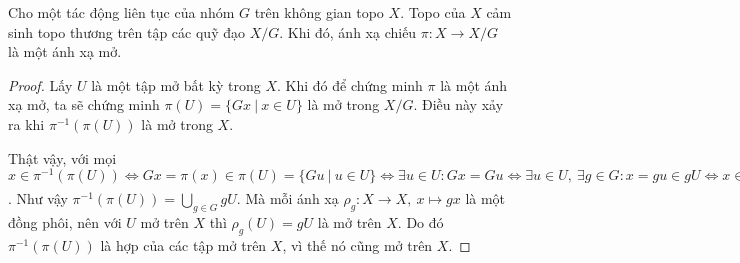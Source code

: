\begin{prop}\label{prop 1.1.6}
    Cho một tác động liên tục của nhóm $G$ trên không gian topo $X$. Topo của $X$ cảm sinh topo thương trên tập các quỹ đạo $X/G$. Khi đó, ánh xạ chiếu $\pi: X\to X/G$ là một ánh xạ mở. 
\end{prop}
\begin{proof}
    Lấy $U$ là một tập mở bất kỳ trong $X$. Khi đó để chứng minh $\pi$ là một ánh xạ mở, ta sẽ chứng minh $\pi(U) = \{Gx~|~x\in U\}$ là mở trong $X/G$. Điều này xảy ra khi $\pi^{-1}(\pi(U))$ là mở trong $X$.

    Thật vậy, với mọi $x \in \pi^{-1}(\pi(U))\Leftrightarrow Gx = \pi(x) \in \pi(U) = \{Gu~|~u\in U\}\Leftrightarrow \exists u \in U: Gx = Gu\Leftrightarrow \exists u \in U,~\exists g \in G: x = gu \in gU\Leftrightarrow x\in \bigcup_{g\in G}{gU}$. Như vậy $\pi^{-1}(\pi(U)) = \bigcup_{g\in G}{gU}$. Mà mỗi ánh xạ $\rho_g:X\to X,~x\mapsto gx$ là một đồng phôi, nên với $U$ mở trên $X$ thì $\rho_g(U) = gU$ là mở trên $X$. Do đó $\pi^{-1}(\pi(U))$ là hợp của các tập mở trên $X$, vì thế nó cũng mở trên $X$.
\end{proof}

